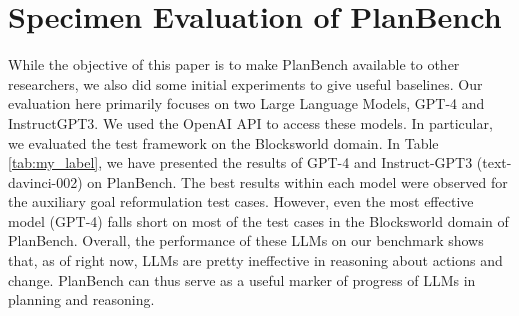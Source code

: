 \section{Specimen Evaluation of PlanBench}
While the objective of this paper is to make PlanBench available to other researchers, we also did some initial experiments to give useful baselines. Our evaluation here primarily focuses on two Large Language Models, GPT-4 and InstructGPT3. We used the OpenAI API to access these models. In particular, we evaluated the test framework on the Blocksworld domain. In Table \ref{tab:my_label}, we have presented the results of GPT-4 and Instruct-GPT3 (text-davinci-002) on PlanBench. The best results within each model were observed for the auxiliary goal reformulation test cases. However, even the most effective model (GPT-4) falls short on most of the test cases in the Blocksworld domain of PlanBench. Overall, the performance of these LLMs on our benchmark shows that, as of right now, LLMs are pretty ineffective in reasoning about actions and change. PlanBench can thus serve as a useful marker of progress of LLMs in planning and reasoning. 

